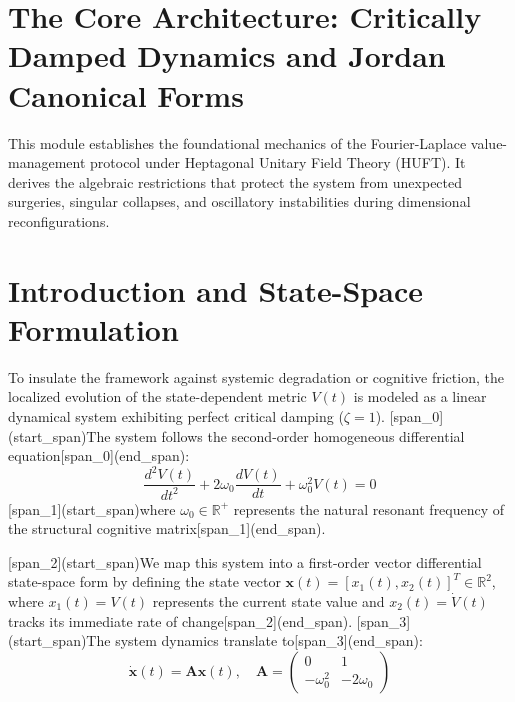 \documentclass[12pt,letterpaper]{article}
\theoremstyle{definition}
\begin{document}
\section*{The Core Architecture: Critically Damped Dynamics and Jordan Canonical Forms}

This module establishes the foundational mechanics of the Fourier-Laplace value-management protocol under Heptagonal Unitary Field Theory (HUFT). It derives the algebraic restrictions that protect the system from unexpected surgeries, singular collapses, and oscillatory instabilities during dimensional reconfigurations.

\section{Introduction and State-Space Formulation}
To insulate the framework against systemic degradation or cognitive friction, the localized evolution of the state-dependent metric $V(t)$ is modeled as a linear dynamical system exhibiting perfect critical damping ($\zeta = 1$). [span_0](start_span)The system follows the second-order homogeneous differential equation[span_0](end_span):
\begin{equation}
    \frac{d^{2}V(t)}{dt^{2}} + 2\omega_{0}\frac{dV(t)}{dt} + \omega_{0}^{2}V(t) = 0
\end{equation}
[span_1](start_span)where $\omega_{0} \in \mathbb{R}^{+}$ represents the natural resonant frequency of the structural cognitive matrix[span_1](end_span).

[span_2](start_span)We map this system into a first-order vector differential state-space form by defining the state vector $\mathbf{x}(t) = [x_{1}(t), x_{2}(t)]^{T} \in \mathbb{R}^{2}$, where $x_{1}(t) = V(t)$ represents the current state value and $x_{2}(t) = \dot{V}(t)$ tracks its immediate rate of change[span_2](end_span). [span_3](start_span)The system dynamics translate to[span_3](end_span):
\begin{equation}
    \dot{\mathbf{x}}(t) = \mathbf{A}\mathbf{x}(t), \quad \mathbf{A} = \begin{pmatrix} 0 & 1 \\ -\omega_{0}^{2} & -2\omega_{0} \end{pmatrix}
\end{equation}
\end{document}
